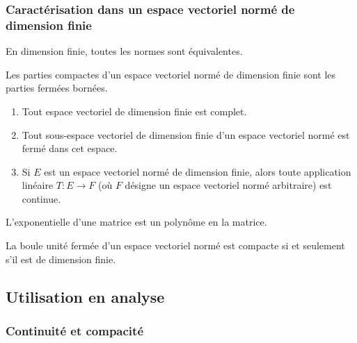   \subsubsection{Caractérisation dans un espace vectoriel normé de dimension finie}


  \begin{theorem}
    En dimension finie, toutes les normes sont équivalentes.
  \end{theorem}

  \begin{corollary}
    Les parties compactes d'un espace vectoriel normé de dimension finie sont les parties fermées bornées.
  \end{corollary}

  \begin{corollary}
    \begin{enumerate}[label={\bfseries(\roman*)}]
      \item Tout espace vectoriel de dimension finie est complet.
      \item Tout sous-espace vectoriel de dimension finie d'un espace vectoriel normé est fermé dans cet espace.
      \item Si $E$ est un espace vectoriel normé de dimension finie, alors toute application linéaire $T : E \rightarrow F$ (où $F$ désigne un espace vectoriel normé arbitraire) est continue.
    \end{enumerate}
  \end{corollary}


  \begin{application}
    L'exponentielle d'une matrice est un polynôme en la matrice.
  \end{application}


  \begin{theorem}
    La boule unité fermée d'un espace vectoriel normé est compacte si et seulement s'il est de dimension finie.
  \end{theorem}

  \subsection{Utilisation en analyse}

  \subsubsection{Continuité et compacité}

